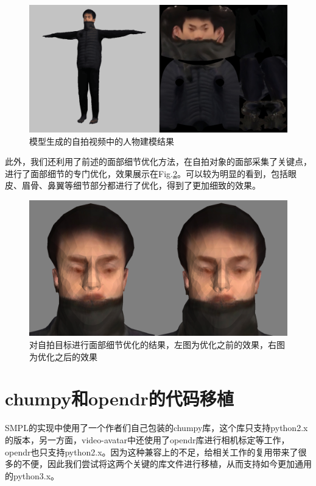 \documentclass{article}
\begin{document}
\begin{figure}[H]
	\centering
	\includegraphics[width=14cm]{figure/selfshoot_res1}
	\caption{模型生成的自拍视频中的人物建模结果}
	\label{hures}
\end{figure}

此外，我们还利用了前述的面部细节优化方法，在自拍对象的面部采集了关键点，进行了面部细节的专门优化，效果展示在Fig.\ref{huface}。可以较为明显的看到，包括眼皮、眉骨、鼻翼等细节部分都进行了优化，得到了更加细致的效果。

\begin{figure}
	\centering
	\includegraphics[width=14cm]{figure/selfshoot_Face_compare.png}
	\caption{对自拍目标进行面部细节优化的结果，左图为优化之前的效果，右图为优化之后的效果}
	\label{huface}
\end{figure}

\section{chumpy和opendr的代码移植}
SMPL的实现中使用了一个作者们自己包装的chumpy库，这个库只支持python2.x的版本，另一方面，video-avatar中还使用了opendr库进行相机标定等工作，opendr也只支持python2.x。因为这种兼容上的不足，给相关工作的复用带来了很多的不便，因此我们尝试将这两个关键的库文件进行移植，从而支持如今更加通用的python3.x。
\end{document}
